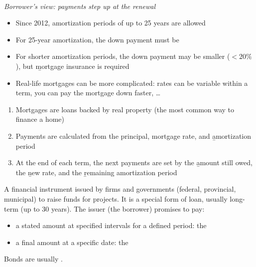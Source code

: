 \begin{center}
    \\[2pt] \textit{\small Borrower's view: payments step up at the renewal}
\end{center}

\begin{itemize}
    \item Since 2012, amortization periods of up to 25 years are allowed
    \item For 25-year amortization, the down payment must be 
    \item For shorter amortization periods, the down payment may be smaller ($<20\%$), but \b{mortgage insurance} is required
    \item Real-life mortgages can be more complicated: rates can be variable within a term, you can pay the mortgage down faster, \dots
\end{itemize}

\begin{enumerate}
    \item Mortgages are loans backed by real property (the most common way to finance a home)
    \item Payments are calculated from the principal, mortgage rate, and \b{amortization period}
    \item At the end of each term, the next payments are set by the \b{amount still owed}, the \b{new rate}, and the \b{remaining amortization period}
\end{enumerate}


\begin{definition}[Bond]
    A financial instrument issued by firms and governments (federal,
    provincial, municipal) to raise funds for projects. It is a special form
    of loan, usually long-term (up to 30 years). The issuer (the borrower)
    promises to pay:
    \begin{itemize}
        \item a stated amount at specified intervals for a defined period: the 
        \item a final amount at a specific date: the 
    \end{itemize}
    Bonds are usually .
\end{definition}


